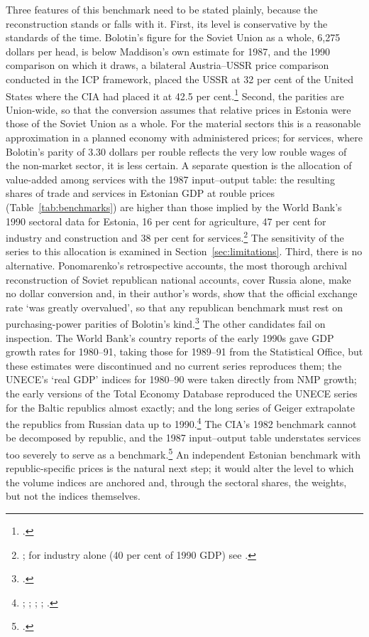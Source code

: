 Three features of this benchmark need to be stated plainly, because the reconstruction stands or falls with it. First, its level is conservative by the standards of the time. Bolotin's figure for the Soviet Union as a whole, 6,275 dollars per head, is below Maddison's own estimate for 1987, and the 1990 comparison on which it draws, a bilateral Austria--USSR price comparison conducted in the ICP framework, placed the USSR at 32 per cent of the United States where the CIA had placed it at 42.5 per cent.\footnote{\autocite[318--19]{Maddison1998b}.} Second, the parities are Union-wide, so that the conversion assumes that relative prices in Estonia were those of the Soviet Union as a whole. For the material sectors this is a reasonable approximation in a planned economy with administered prices; for services, where Bolotin's parity of 3.30 dollars per rouble reflects the very low rouble wages of the non-market sector, it is less certain. A separate question is the allocation of value-added among services with the 1987 input--output table: the resulting shares of trade and services in Estonian GDP at rouble prices (Table~\ref{tab:benchmarks}) are higher than those implied by the World Bank's 1990 sectoral data for Estonia, 16 per cent for agriculture, 47 per cent for industry and construction and 38 per cent for services.\footnote{\autocite{wbstatisticalhandbook1994}; for industry alone (40 per cent of 1990 GDP) see \autocite[85]{wb1993estonia}.} The sensitivity of the series to this allocation is examined in Section~\ref{sec:limitations}. Third, there is no alternative. Ponomarenko's retrospective accounts, the most thorough archival reconstruction of Soviet republican national accounts, cover Russia alone, make no dollar conversion and, in their author's words, show that the official exchange rate `was greatly overvalued', so that any republican benchmark must rest on purchasing-power parities of Bolotin's kind.\footnote{\autocite[6, 15, 82]{ponomarenko2002}.} The other candidates fail on inspection. The World Bank's country reports of the early 1990s gave GDP growth rates for 1980--91, taking those for 1989--91 from the Statistical Office, but these estimates were discontinued and no current series reproduces them; the UNECE's `real GDP' indices for 1980--90 were taken directly from NMP growth; the early versions of the Total Economy Database reproduced the UNECE series for the Baltic republics almost exactly; and the long series of Geiger extrapolate the republics from Russian data up to 1990.\footnote{\autocite[2, 5]{wb1993estonia}; \autocite[32--3]{worldtables1995}; \autocite[249]{UNECE1995}; \autocite[199]{UNECE1998}; \autocite{GeigerTobias2018Cngd}.} The CIA's 1982 benchmark cannot be decomposed by republic, and the 1987 input--output table understates services too severely to serve as a benchmark.\footnote{\autocite[66--89]{wbinputoutput1987}.} An independent Estonian benchmark with republic-specific prices is the natural next step; it would alter the level to which the volume indices are anchored and, through the sectoral shares, the weights, but not the indices themselves.

